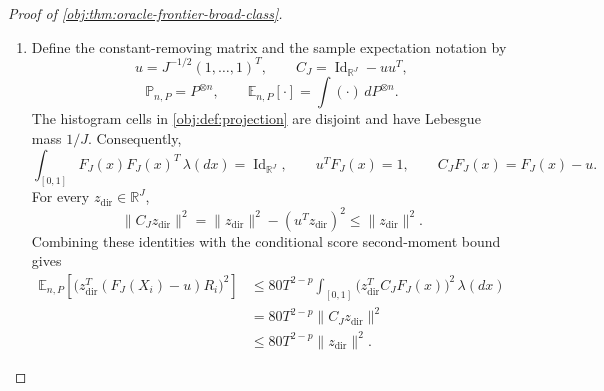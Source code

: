 \documentclass[11pt]{article}
\begin{document}
\begin{proof}[Proof of \cref{obj:thm:oracle-frontier-broad-class}]
\begin{enumerate}
The elementary clipping inequalities are
\[
|y-\ell_T(y)|\le |y|^pT^{1-p},
\qquad
\ell_T(y)^2\le |y|^pT^{2-p}.
\]
Indeed, when \(|y|\le T\), the first difference vanishes and
\[
y^2=|y|^p|y|^{2-p}\le |y|^pT^{2-p}.
\]
When \(|y|>T\), the clipping remainder is at most \(|y|\), and
\[
|y|
=|y|^p|y|^{1-p}
\le |y|^pT^{1-p},
\qquad
\ell_T(y)^2\le T^2
=T^pT^{2-p}\le |y|^pT^{2-p}.
\]
The raw moment restriction gives first-moment integrability in both arms, using \(|y|\le1+|y|^p\). Integrating the two clipping inequalities yields, for \(\lambda\)-almost every \(x\),
\[
\left|\int_{\mathbb R}(y-\ell_T(y))\,Q_{\iota_{\mathrm{arm}},P}(dy\mid x)\right|
\le10T^{1-p},
\qquad
\int_{\mathbb R}\ell_T(y)^2\,Q_{\iota_{\mathrm{arm}},P}(dy\mid x)
\le10T^{2-p}
\quad(\iota_{\mathrm{arm}}\in\{0,1\}).
\]

Define the clipped conditional score mean by
\[
g_{T,P}(x)
=
\int_{\mathbb R}\ell_T(y)\,Q_{1,P}(dy\mid x)
-
\int_{\mathbb R}\ell_T(y)\,Q_{0,P}(dy\mid x).
\]
Cancellation of the arm probabilities against the inverse-propensity denominators identifies this function as the conditional mean of \(R_i\). The conditional arm-mean identities then give
\[
|g_{T,P}(x)-\tau_P(x)|\le20T^{1-p}=b
\]
almost everywhere. The conditional second moment of the score satisfies
\[
\begin{aligned}
\mathbb E(R_i^2\mid X_i=x)
&=
\frac{\int\ell_T(y)^2\,Q_{1,P}(dy\mid x)}{e_P(x)}
+
\frac{\int\ell_T(y)^2\,Q_{0,P}(dy\mid x)}{1-e_P(x)}
\\
&\le40T^{2-p}+40T^{2-p}
=80T^{2-p}.
\end{aligned}
\]

\item Define the constant-removing matrix and the sample expectation notation by
\[
u=J^{-1/2}(1,\ldots,1)^T,\qquad
C_J=\operatorname{Id}_{\mathbb R^J}-uu^T,
\]
\[
\mathbb P_{n,P}=P^{\otimes n},
\qquad
\mathbb E_{n,P}[\cdot]=\int(\cdot)\,dP^{\otimes n}.
\]
The histogram cells in \cref{obj:def:projection} are disjoint and have Lebesgue mass \(1/J\). Consequently,
\[
\int_{[0,1]}F_J(x)F_J(x)^T\,\lambda(dx)
=\operatorname{Id}_{\mathbb R^J},
\qquad
u^TF_J(x)=1,
\qquad
C_JF_J(x)=F_J(x)-u.
\]
For every \(z_{\mathrm{dir}}\in\mathbb R^J\),
\[
\|C_Jz_{\mathrm{dir}}\|^2
=\|z_{\mathrm{dir}}\|^2-(u^Tz_{\mathrm{dir}})^2
\le\|z_{\mathrm{dir}}\|^2.
\]
Combining these identities with the conditional score second-moment bound gives
\[
\begin{aligned}
\mathbb E_{n,P}
\!\left[\bigl(z_{\mathrm{dir}}^T(F_J(X_i)-u)R_i\bigr)^2\right]
&\le80T^{2-p}
\int_{[0,1]}
\bigl(z_{\mathrm{dir}}^TC_JF_J(x)\bigr)^2\,\lambda(dx)
\\
&=80T^{2-p}\|C_Jz_{\mathrm{dir}}\|^2
\\
&\le80T^{2-p}\|z_{\mathrm{dir}}\|^2.
\end{aligned}
\]


\end{enumerate}
\end{proof}
\end{document}
